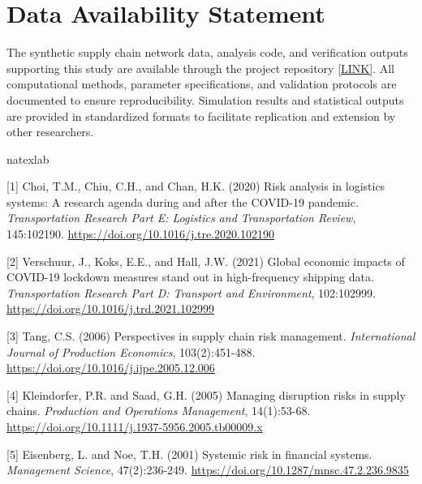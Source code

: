 \documentclass[a4 paper, 11pt,twoside]{article}
\newcommand{\0}{\Bf{0}}
\theoremstyle{definition}
\begin{document}
\section*{Data Availability Statement}

The synthetic supply chain network data, analysis code, and verification outputs supporting this study are available through the project repository \href{https://github.com/omoshola-o/network_analysis_supply_chain}{[LINK]}. All computational methods, parameter specifications, and validation protocols are documented to ensure reproducibility. Simulation results and statistical outputs are provided in standardized formats to facilitate replication and extension by other researchers.

\def\cprime{$'$} \def\cprime{$'$}
{\color{Brown}\begin{thebibliography}{8}
{\color{black}

\expandafter\ifx\csname natexlab\endcsname\relax\def\natexlab#1{#1}\fi
\providecommand{\bibinfo}[2]{#2}
\ifx\xfnm\relax \def\xfnm[#1]{\unskip,\space#1}\fi

\label{ref1}[1] Choi, T.M., Chiu, C.H., and Chan, H.K. (2020) Risk analysis in logistics systems: A research agenda during and after the COVID-19 pandemic. \emph{Transportation Research Part E: Logistics and Transportation Review}, 145:102190. \href{https://doi.org/10.1016/j.tre.2020.102190}{https://doi.org/10.1016/j.tre.2020.102190}

\label{ref2}[2] Verschuur, J., Koks, E.E., and Hall, J.W. (2021) Global economic impacts of COVID-19 lockdown measures stand out in high-frequency shipping data. \emph{Transportation Research Part D: Transport and Environment}, 102:102999. \href{https://doi.org/10.1016/j.trd.2021.102999}{https://doi.org/10.1016/j.trd.2021.102999}


\label{ref3}[3] Tang, C.S. (2006) Perspectives in supply chain risk management. \emph{International Journal of Production Economics}, 103(2):451-488. \href{https://doi.org/10.1016/j.ijpe.2005.12.006}{https://doi.org/10.1016/j.ijpe.2005.12.006}

\label{ref4}[4] Kleindorfer, P.R. and Saad, G.H. (2005) Managing disruption risks in supply chains. \emph{Production and Operations Management}, 14(1):53-68. \href{https://doi.org/10.1111/j.1937-5956.2005.tb00009.x}{https://doi.org/10.1111/j.1937-5956.2005.tb00009.x}

\label{ref5}[5] Eisenberg, L. and Noe, T.H. (2001) Systemic risk in financial systems. \emph{Management Science}, 47(2):236-249. \href{https://doi.org/10.1287/mnsc.47.2.236.9835}{https://doi.org/10.1287/mnsc.47.2.236.9835}

}
\end{thebibliography}}
\end{document}
